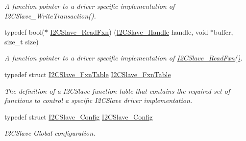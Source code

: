 \begin{DoxyCompactItemize}
\begin{DoxyCompactList}\small\item\em A function pointer to a driver specific implementation of I2\+C\+Slave\+\_\+\+Write\+Transaction(). \end{DoxyCompactList}\item 
typedef bool($\ast$ \hyperlink{_i2_c_slave_8h_ac74d6f05afaf02a4238fe59a588cd787}{I2\+C\+Slave\+\_\+\+Read\+Fxn}) (\hyperlink{_i2_c_slave_8h_a302d775f802ff66ed2ca05e1956f738e}{I2\+C\+Slave\+\_\+\+Handle} handle, void $\ast$buffer, size\+\_\+t size)
\begin{DoxyCompactList}\small\item\em A function pointer to a driver specific implementation of \hyperlink{_i2_c_slave_8h_ac74d6f05afaf02a4238fe59a588cd787}{I2\+C\+Slave\+\_\+\+Read\+Fxn()}. \end{DoxyCompactList}\item 
typedef struct \hyperlink{struct_i2_c_slave___fxn_table}{I2\+C\+Slave\+\_\+\+Fxn\+Table} \hyperlink{_i2_c_slave_8h_a5c5679b810eaceb9aef157fefe2e4608}{I2\+C\+Slave\+\_\+\+Fxn\+Table}
\begin{DoxyCompactList}\small\item\em The definition of a I2\+C\+Slave function table that contains the required set of functions to control a specific I2\+C\+Slave driver implementation. \end{DoxyCompactList}\item 
typedef struct \hyperlink{struct_i2_c_slave___config}{I2\+C\+Slave\+\_\+\+Config} \hyperlink{_i2_c_slave_8h_a8f8cf70723a9a12867dbdb3e12caa300}{I2\+C\+Slave\+\_\+\+Config}
\begin{DoxyCompactList}\small\item\em I2\+C\+Slave Global configuration. \end{DoxyCompactList}\end{DoxyCompactItemize}
